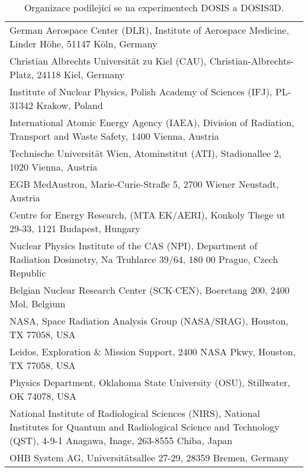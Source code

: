 \begin{table}[H]
  \centering
\renewcommand{\baselinestretch}{0.8}
\renewcommand{\arraystretch}{2}
\footnotesize
\caption{Organizace podílející se na experimentech DOSIS a DOSIS3D. \cite{dosis}}
  \label{tab:dosis_instituce}
  \begin{tabularx}{\textwidth}{X}
	\toprule
German Aerospace Center (DLR), Institute of Aerospace Medicine, Linder Höhe, 51147 Köln, Germany\\
Christian Albrechts Universität zu Kiel (CAU), Christian-Albrechts-Platz, 24118 Kiel, Germany                                    \\
Institute of Nuclear Physics, Polish Academy of Sciences (IFJ), PL-31342 Krakow, Poland                                          \\
International Atomic Energy Agency (IAEA), Division of Radiation, Transport and Waste Safety, 1400 Vienna, Austria               \\
Technische Universität Wien, Atominstitut (ATI), Stadionallee 2, 1020 Vienna, Austria                                            \\
EGB MedAustron, Marie-Curie-Straße 5, 2700 Wiener Neustadt, Austria                                                              \\
Centre for Energy Research, (MTA EK/AERI), Konkoly Thege ut 29-33, 1121 Budapest, Hungary                                             \\
Nuclear Physics Institute of the CAS (NPI), Department of Radiation Dosimetry, Na Truhlarce 39/64, 180 00 Prague, Czech Republic \\
Belgian Nuclear Research Center (SCK$\cdot$CEN), Boeretang 200, 2400 Mol, Belgium    \\
NASA, Space Radiation Analysis Group (NASA/SRAG), Houston, TX 77058, USA       \\
Leidos, Exploration \& Mission Support, 2400 NASA Pkwy, Houston, TX 77058, USA  \\
Physics Department, Oklahoma State University (OSU), Stillwater, OK 74078, USA \\
National Institute of Radiological Sciences (NIRS), National Institutes for Quantum and Radiological Science and Technology (QST), 4-9-1 Anagawa, Inage, 263-8555 Chiba, Japan\\
OHB System AG, Universitätsallee 27-29, 28359 Bremen, Germany\\
\bottomrule
  \end{tabularx}
\end{table}


